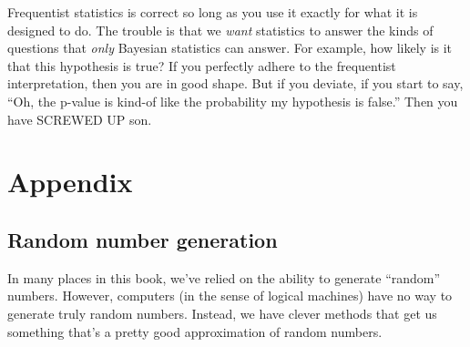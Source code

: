 \documentclass{book}
\begin{document}
Frequentist statistics is correct so long as you use it exactly for what
it is designed to do. The trouble is that we \emph{want} statistics to
answer the kinds of questions that \emph{only} Bayesian statistics can
answer. For example, how likely is it that this hypothesis is true? If
you perfectly adhere to the frequentist interpretation, then you are in
good shape. But if you deviate, if you start to say, ``Oh, the p-value
is kind-of like the probability my hypothesis is false.'' Then you have
SCREWED UP son.

\section{Appendix}\label{appendix}

\subsection{Random number generation}\label{random-number-generation}

In many places in this book, we've relied on the ability to generate
``random'' numbers. However, computers (in the sense of logical
machines) have no way to generate truly random numbers. Instead, we have
clever methods that get us something that's a pretty good approximation
of random numbers.
\end{document}
